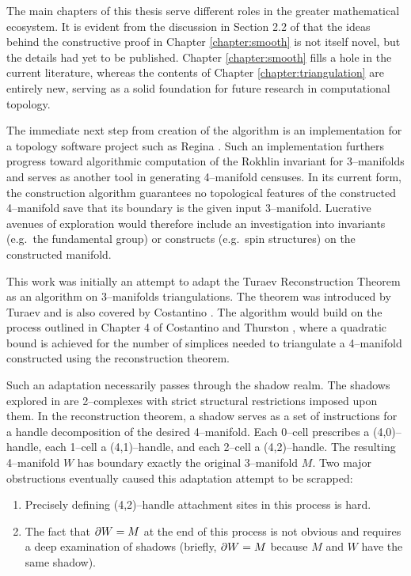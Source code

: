 \label{chapter:conclusion}

The main chapters of this thesis serve different roles in the greater mathematical ecosystem.
It is evident from the discussion in Section 2.2 of \cite{CostThur08} that the ideas behind the constructive proof in Chapter \ref{chapter:smooth} is not itself novel, but the details had yet to be published.
Chapter \ref{chapter:smooth} fills a hole in the current literature, whereas the contents of Chapter \ref{chapter:triangulation} are entirely new, serving as a solid foundation for future research in computational topology.

The immediate next step from creation of the algorithm is an implementation for a topology software project such as Regina \cite{regina}.
Such an implementation furthers progress toward algorithmic computation of the Rokhlin invariant for 3--manifolds and serves as another tool in generating 4--manifold censuses.
In its current form, the construction algorithm guarantees no topological features of the constructed 4--manifold save that its boundary is the given input 3--manifold.
Lucrative avenues of exploration would therefore include an investigation into invariants (e.g.\ the fundamental group) or constructs (e.g.\ spin structures) on the constructed manifold.

This work was initially an attempt to adapt the Turaev Reconstruction Theorem as an algorithm on 3--manifolds triangulations.
The theorem was introduced by Turaev \cite{Turaev91} and is also covered by Costantino \cite{Cost05}.
The algorithm would build on the process outlined in Chapter 4 of Costantino and Thurston \cite{CostThur08}, where a quadratic bound is achieved for the number of simplices needed to triangulate a 4--manifold constructed using the reconstruction theorem.

Such an adaptation necessarily passes through the shadow realm.
The shadows explored in \cite{Turaev91} are 2--complexes with strict structural restrictions imposed upon them.
In the reconstruction theorem, a shadow serves as a set of instructions for a handle decomposition of the desired 4--manifold.
Each 0--cell prescribes a (4,0)--handle, each 1--cell a (4,1)--handle, and each 2--cell a (4,2)--handle.
The resulting 4--manifold $W$ has boundary exactly the original 3--manifold $M$.
Two major obstructions eventually caused this adaptation attempt to be scrapped:
\begin{enumerate}
	\item Precisely defining (4,2)--handle attachment sites in this process is hard.
	\item The fact that $\partial W = M$ at the end of this process is not obvious and requires a deep examination of shadows (briefly, $\partial W = M$ because $M$ and $W$ have the same shadow).
\end{enumerate}


